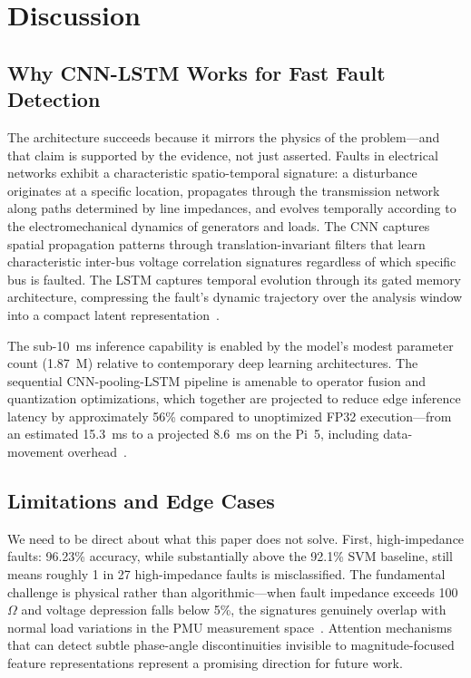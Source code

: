 \documentclass[journal]{IEEEtran}
\begin{document}
\section{Discussion}
\label{sec:discussion}

\subsection{Why CNN-LSTM Works for Fast Fault Detection}

The architecture succeeds because it mirrors the physics of the problem---and that claim is supported by the evidence, not just asserted. Faults in electrical networks exhibit a characteristic spatio-temporal signature: a disturbance originates at a specific location, propagates through the transmission network along paths determined by line impedances, and evolves temporally according to the electromechanical dynamics of generators and loads. The CNN captures spatial propagation patterns through translation-invariant filters that learn characteristic inter-bus voltage correlation signatures regardless of which specific bus is faulted. The LSTM captures temporal evolution through its gated memory architecture, compressing the fault's dynamic trajectory over the analysis window into a compact latent representation~\cite{ref11,ref26}.

The sub-10~ms inference capability is enabled by the model's modest parameter count (1.87~M) relative to contemporary deep learning architectures. The sequential CNN-pooling-LSTM pipeline is amenable to operator fusion and quantization optimizations, which together are projected to reduce edge inference latency by approximately 56\% compared to unoptimized FP32 execution---from an estimated 15.3~ms to a projected 8.6~ms on the Pi~5, including data-movement overhead~\cite{ref30}.

\subsection{Limitations and Edge Cases}

We need to be direct about what this paper does not solve. First, high-impedance faults: 96.23\% accuracy, while substantially above the 92.1\% SVM baseline, still means roughly 1 in 27 high-impedance faults is misclassified. The fundamental challenge is physical rather than algorithmic---when fault impedance exceeds 100~$\Omega$ and voltage depression falls below 5\%, the signatures genuinely overlap with normal load variations in the PMU measurement space~\cite{ref18}. Attention mechanisms that can detect subtle phase-angle discontinuities invisible to magnitude-focused feature representations represent a promising direction for future work.
\end{document}
